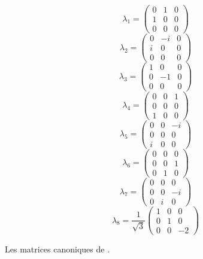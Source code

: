 {
\begin{equation*}
\lambda_{1}=\begin{pmatrix} 
0&1&0\\
1&0&0\\
0&0&0
\end{pmatrix}
\end{equation*}
\vspace{0.2cm}
\begin{equation*}
\lambda_{2}=\begin{pmatrix} 
0&-i&0\\
i&0&0\\
0&0&0
\end{pmatrix}
\end{equation*}
\vspace{0.2cm}
\begin{equation*}
\lambda_{3}=\begin{pmatrix} 
1&0&0\\
0&-1&0\\
0&0&0
\end{pmatrix}
\end{equation*}
\vspace{0.2cm}
\begin{equation*}
\lambda_{4}=\begin{pmatrix} 
0&0&1\\
0&0&0\\
1&0&0
\end{pmatrix}
\end{equation*}
\vspace{0.2cm}
\begin{equation*}
\lambda_{5}=\begin{pmatrix} 
0&0&-i\\
0&0&0\\
i&0&0
\end{pmatrix}
\end{equation*}
\vspace{0.2cm}
\begin{equation*}
\lambda_{6}=\begin{pmatrix} 
0&0&0\\
0&0&1\\
0&1&0
\end{pmatrix}
\end{equation*}
\vspace{0.2cm}
\begin{equation*}
\lambda_{7}=\begin{pmatrix} 
0&0&0\\
0&0&-i\\
0&i&0
\end{pmatrix}
\end{equation*}
\vspace{0.2cm}
\begin{equation*}
\lambda_{8}=\frac{1}{\sqrt{3}}\begin{pmatrix} 
1&0&0\\
0&1&0\\
0&0&-2
\end{pmatrix}
\end{equation*}
\captionsetup{type=figure}\caption{Les matrices canoniques de .}
\label{Gell-Mann}
}

